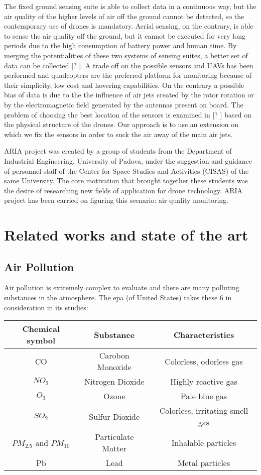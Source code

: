 The fixed ground sensing suite is able to collect data in a continuous way, but the air quality of the higher levels of air off the ground cannot be detected, so the contemporary use of drones is mandatory. Aerial sensing, on the contrary, is able to sense the air quality off the ground, but it cannot be executed for very long periods due to the high consumption of battery power and human time. By merging the potentialities of these two systems of sensing suites, a better set of data can be collected [? ]. A trade off on the possible sensors and UAVs has been performed and quadcopters are the preferred platform for monitoring because of their simplicity, low cost and hovering capabilities. On the contrary a possible bias of data is due to the the influence of air jets created by the rotor rotation or by the electromagnetic field generated by the antennas present on board. The problem of choosing the best location of the sensors is examined in [? ] based on the physical structure of the drones. Our approach is to use an extension on which we fix the sensors in order to suck the air away of the main air jets.

ARIA project was created by a group of students from the Department of Industrial Engineering, University of Padova, under the suggestion and guidance of personnel staff of the Center for Space Studies and Activities (CISAS) of the same University. The core motivation that brought together these students was the desire of researching new fields of application for drone technology. ARIA project has been carried on figuring this scenario: air quality monitoring.
\section{Related works and state of the art}
\subsection{Air Pollution}
Air pollution is extremely complex to evaluate and there are many polluting substances in the atmosphere. The \gls{epa} (of United States) takes these 6 in consideration in its studies:
\begin{center}
\begin{tabular}{ |c|c|c| }
    \hline
    Chemical symbol & Substance & Characteristics \\ [0.5ex]
    \hline
    CO & Carobon Monoxide & Colorless, odorless gas \\
    $NO_2$ & Nitrogen Dioxide & Highly reactive gas \\
    $O_3$ & Ozone & Pale blue gas \\
    $SO_2$ & Sulfur Dioxide & Colorless, irritating smell gas \\
    $PM_2.5$ and $PM_10$ & Particulate Matter & Inhalable particles \\
    Pb & Lead & Metal particles \\
\end{tabular}
\end{center}
